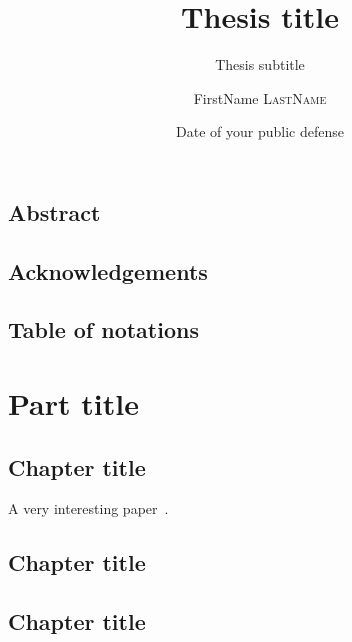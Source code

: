 \documentclass[version]{thesis-ucl}
\title{Thesis title}
\subtitle{Thesis subtitle}
\author{FirstName \textsc{LastName}}
\date{Date of your public defense}
\begin{document}
    \maketitle
    

    \frontmatter
    
    \chapter*{Abstract}
        \lipsum[1-2]
    
    \chapter*{Acknowledgements}
        \lipsum
    
    \tableofcontents
    
    \chapter*{Table of notations}
        \lipsum[1]

    \mainmatter
    
    \part{Part title \label{part:partLabel1}}
        \chapter{Chapter title \label{chap:chapterLabel1}}
            A very interesting paper~\cite{paperID}.
            \lipsum
        
        \chapter{Chapter title \label{chap:chapterLabel12}}
            \lipsum
        
        \chapter{Chapter title \label{chap:chapterLabel13}}
            \lipsum
        
\end{document}
